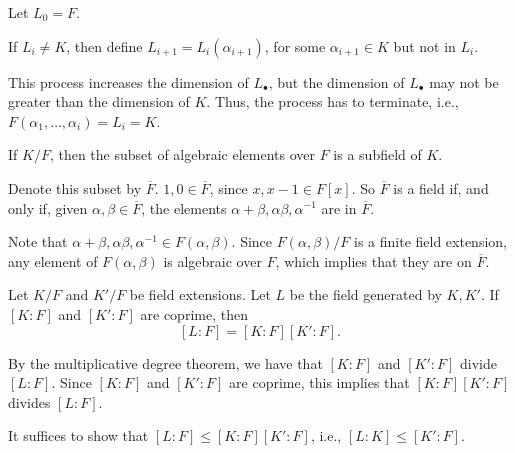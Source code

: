 \begin{sk}
	Let $L_0 = F$.

	If $L_i \neq K$, then define $L_{i+1} = L_i(\alpha_{i+1})$, for some $\alpha_{i+1} \in K$ but not in $L_i$. 

	This process increases the dimension of $L_\bullet$, but the dimension of $L_\bullet$ may not be greater than the dimension of  $K$. Thus, the process has to terminate, i.e., $F(\alpha_1, \dots, \alpha_i) = L_i = K$.
\end{sk}


\begin{cor}
	If $K/F$, then the subset of algebraic elements over $F$ is a subfield of $K$.
\end{cor}

\begin{dem}
	Denote this subset by $\overline F$. $1, 0 \in \overline F$, since $x, x - 1 \in F[x]$. So $\overline F$ is a field if, and only if, given $\alpha, \beta \in \overline F$, the elements $\alpha + \beta, \alpha\beta, \alpha^{-1}$ are in $\overline F$.

	Note that $\alpha + \beta, \alpha\beta, \alpha^{-1} \in F(\alpha, \beta)$. Since $F(\alpha, \beta) / F$ is a finite field extension, any element of $F(\alpha, \beta)$ is algebraic over $F$, which implies that they are on $\overline F$.
\end{dem}

\begin{cor}
	Let $K/F$ and $K'/F$ be field extensions. Let $L$ be the field generated by $K, K'$. If $[K:F]$ and $[K':F]$ are coprime, then \[[L:F] = [K:F] [K':F].\]
\end{cor}

\begin{sk}
	By the multiplicative degree theorem, we have that $[K:F]$ and $[K':F]$ divide $[L:F]$. Since $[K:F]$ and $[K':F]$ are coprime, this implies that $[K:F][K':F]$ divides $[L:F]$.

	It suffices to show that $[L:F] \le [K:F][K':F]$, i.e.,  $[L:K] \le [K':F]$.
\end{sk}
